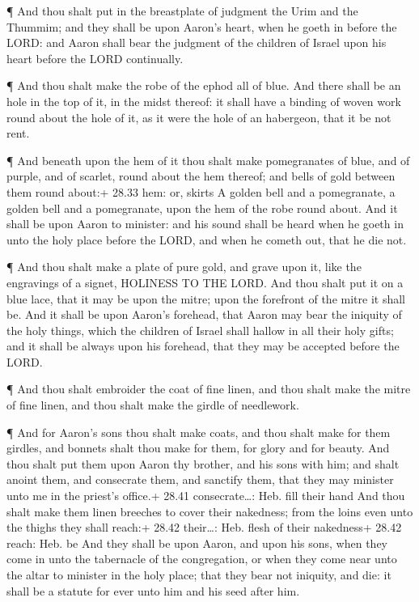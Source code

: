  ¶ And thou shalt put in the breastplate of judgment the
Urim and the Thummim; and they shall be upon Aaron's heart, when he
goeth in before the LORD: and Aaron shall bear the judgment of the
children of Israel upon his heart before the LORD continually.

 ¶ And thou shalt make the robe of the ephod all of blue.
 And there shall be an hole in the top of it, in the midst
thereof: it shall have a binding of woven work round about the hole of
it, as it were the hole of an habergeon, that it be not rent.

 ¶ And beneath upon the hem of it thou shalt make
pomegranates of blue, and of purple, and of scarlet, round about the hem
thereof; and bells of gold between them round about:+ 28.33 hem: or,
skirts  A golden bell and a pomegranate, a golden bell and
a pomegranate, upon the hem of the robe round about.  And
it shall be upon Aaron to minister: and his sound shall be heard when he
goeth in unto the holy place before the LORD, and when he cometh out,
that he die not.

 ¶ And thou shalt make a plate of pure gold, and grave upon
it, like the engravings of a signet, HOLINESS TO THE LORD. 
And thou shalt put it on a blue lace, that it may be upon the mitre;
upon the forefront of the mitre it shall be.  And it shall
be upon Aaron's forehead, that Aaron may bear the iniquity of the holy
things, which the children of Israel shall hallow in all their holy
gifts; and it shall be always upon his forehead, that they may be
accepted before the LORD.

 ¶ And thou shalt embroider the coat of fine linen, and
thou shalt make the mitre of fine linen, and thou shalt make the girdle
of needlework.

 ¶ And for Aaron's sons thou shalt make coats, and thou
shalt make for them girdles, and bonnets shalt thou make for them, for
glory and for beauty.  And thou shalt put them upon Aaron
thy brother, and his sons with him; and shalt anoint them, and
consecrate them, and sanctify them, that they may minister unto me in
the priest's office.+ 28.41 consecrate\ldots: Heb. fill their hand
 And thou shalt make them linen breeches to cover their
nakedness; from the loins even unto the thighs they shall reach:+ 28.42
their\ldots: Heb. flesh of their nakedness+ 28.42 reach: Heb. be
 And they shall be upon Aaron, and upon his sons, when they
come in unto the tabernacle of the congregation, or when they come near
unto the altar to minister in the holy place; that they bear not
iniquity, and die: it shall be a statute for ever unto him and his seed
after him.

